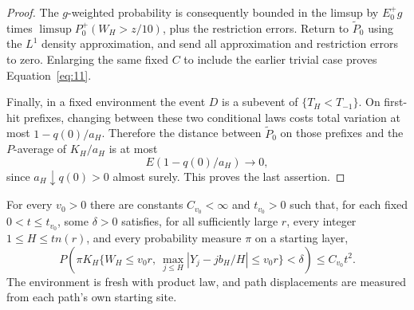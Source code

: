 \begin{proof}
The \(g\)-weighted probability is consequently bounded in the limsup
by \(E_0^+g\) times \(\limsup P_0^+(W_H>z/10)\), plus the
restriction errors. Return to \(\widetilde P_0\) using the
\(L^1\) density approximation, and send all approximation and
restriction errors to zero. Enlarging the same fixed \(C\) to include
the earlier trivial case proves Equation~\eqref{eq:11}.

Finally, in a fixed environment the event \(D\) is a subevent of
\(\{T_H<T_{-1}\}\). On first-hit prefixes, changing between these
two conditional laws costs total variation at most \(1-q(0)/a_H\).
Therefore the distance between \(\widetilde P_0\) on those prefixes
and the \(P\)-average of \(K_H/a_H\) is at most
\[
E(1-q(0)/a_H)\longrightarrow0,
\]
since \(a_H\downarrow q(0)>0\) almost surely. This proves the last
assertion.
\end{proof}

\begin{proposition}
\label{fluct-short-block}
For every \(v_0>0\) there are constants \(C_{v_0}<\infty\) and
\(t_{v_0}>0\) such that, for each fixed \(0<t\le t_{v_0}\), some
\(\delta>0\) satisfies, for all sufficiently large \(r\), every
integer \(1\le H\le tn(r)\), and every probability measure \(\pi\)
on a starting layer,
\[
P\left(
 \pi K_H\{W_H\le v_0r,\
       \max_{j\le H}|Y_j-jb_H/H|\le v_0r\}<\delta
 \right)
 \le C_{v_0}t^2.
\tag{12}\label{eq:12}
\]
The environment is fresh with product law, and path displacements
are measured from each path's own starting site.
\end{proposition}


